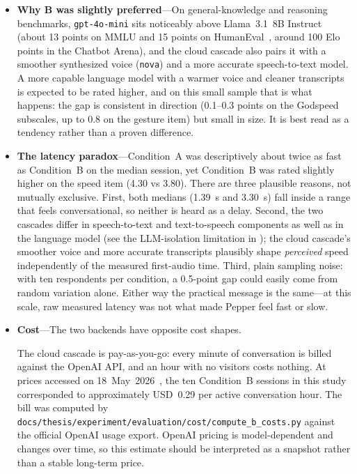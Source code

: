 \begin{itemize}
    \item \textbf{Why B was slightly preferred}---On general-knowledge and reasoning benchmarks, \texttt{gpt-4o-mini} sits noticeably above Llama~3.1~8B Instruct (about 13 points on MMLU and 15 points on HumanEval~\cite{openai2024gpt4omini,grattafiori2024llama3}, around 100 Elo points in the Chatbot Arena), and the cloud cascade also pairs it with a smoother synthesized voice (\texttt{nova}) and a more accurate speech-to-text model. A more capable language model with a warmer voice and cleaner transcripts is expected to be rated higher, and on this small sample that is what happens: the gap is consistent in direction (0.1--0.3 points on the Godspeed subscales, up to 0.8 on the gesture item) but small in size. It is best read as a tendency rather than a proven difference.

    \item \textbf{The latency paradox}---Condition~A was descriptively about twice as fast as Condition~B on the median session, yet Condition~B was rated slightly higher on the speed item (4.30 vs 3.80). There are three plausible reasons, not mutually exclusive. First, both medians (1.39~s and 3.30~s) fall inside a range that feels conversational, so neither is heard as a delay. Second, the two cascades differ in speech-to-text and text-to-speech components as well as in the language model (see the LLM-isolation limitation in ); the cloud cascade's smoother voice and more accurate transcripts plausibly shape \emph{perceived} speed independently of the measured first-audio time. Third, plain sampling noise: with ten respondents per condition, a 0.5-point gap could easily come from random variation alone. Either way the practical message is the same---at this scale, raw measured latency was not what made Pepper feel fast or slow.

    \item \textbf{Cost}---The two backends have opposite cost shapes.

    The cloud cascade is pay-as-you-go: every minute of conversation is billed against the OpenAI API, and an hour with no visitors costs nothing. At prices accessed on 18~May~2026~\cite{openai_pricing}, the ten Condition~B sessions in this study corresponded to approximately USD~0.29 per active conversation hour. The bill was computed by \texttt{docs/thesis/experiment/\allowbreak evaluation/cost/\allowbreak compute\_b\_costs.py} against the official OpenAI usage export. OpenAI pricing is model-dependent and changes over time, so this estimate should be interpreted as a snapshot rather than a stable long-term price.


\end{itemize}
